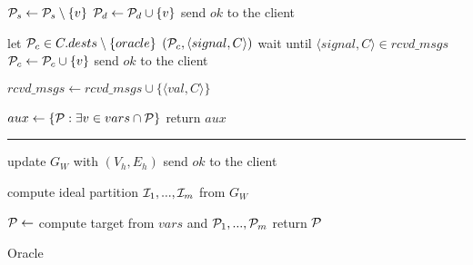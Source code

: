 \begin{algorithm}[t!]
\begin{distribalgo}[1]
                \STATE $\mathcal{P}_s \leftarrow \mathcal{P}_s \setminus \{v\}$
                \STATE $\mathcal{P}_d \leftarrow \mathcal{P}_d \cup      \{v\}$
                \STATE send $ok$ to the client
	\ENDINDENT

        \vspace{1.0mm}
    
		\STATE let $\mathcal{P}_c \in C.dests \setminus \{oracle\}$
		\STATE \rmcast$(\mathcal{P}_c, \langle signal, C \rangle )$
		\STATE wait until $\langle signal, C \rangle \in rcvd\_msgs$
		\STATE $\mathcal{P}_c \leftarrow \mathcal{P}_c \cup      \{v\}$
                \STATE send $ok$ to the client
	\ENDINDENT

	\vspace{1.0mm}
		\STATE $rcvd\_msgs \leftarrow rcvd\_msgs \cup \{\langle val, C \rangle\}$
	\ENDINDENT
	
	\vspace{1.0mm}
		\STATE $aux \leftarrow \{ \mathcal{P} : \exists v \in vars \cap \mathcal{P} \}$
		\STATE return $aux$
	\ENDINDENT
	
	\rule{83mm}{0.4pt}

		\STATE update $G_W$ with $(V_h,E_h)$
		\STATE send $ok$ to the client
	\ENDINDENT
	
	\vspace{1.0mm}
    
		\STATE compute ideal partition $\mathcal{I}_1, ..., \mathcal{I}_m$ from $G_W$
	\ENDINDENT
	
	\vspace{1.0mm}
    
		\STATE $\mathcal{P} \leftarrow$ compute target from $vars$ and $\mathcal{P}_1, ..., \mathcal{P}_m$
		\STATE return $\mathcal{P}$
	\ENDINDENT	
	
%        


\caption{Oracle}
\label{alg:oracle_proxy}
\end{distribalgo}
\end{algorithm}